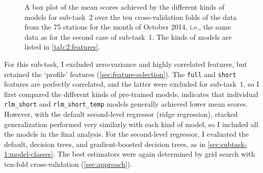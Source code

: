 \documentclass[11pt]{extarticle}
\newcommand{\rlmfull}{\texttt{rlm\_full}}
\newcommand{\rlmfulltemp}{\texttt{rlm\_full\_temp}}
\newcommand{\rlmshort}{\texttt{rlm\_short}}
\newcommand{\rlmshortfull}{\texttt{rlm\_short\_full}}
\newcommand{\rlmshortfulltemp}{\texttt{rlm\_short\_full\_temp}}
\newcommand{\rlmshorttemp}{\texttt{rlm\_short\_temp}}
\begin{document}
\begin{figure}
  \centering
  \caption{A box plot of the mean scores achieved by the different kinds of models for
    sub-task~2 over the ten cross-validation folds of the data from the 75 stations for
    the month of October 2014, i.e., the same data as for the second case of sub-task~1.
    The kinds of models are listed in \cref{tab:2:features}.
  }
  \label{fig:2:box-plot}
\end{figure}

For this sub-task, I excluded zero-variance and highly correlated features, but
retained the `profile' features (\cref{sec:feature-selection}).
The \texttt{full} and \texttt{short} features are perfectly correlated, and the latter
were excluded for sub-task~1, so I first compared the different kinds of pre-trained
models.
 indicates that individual \rlmshort{} and \rlmshorttemp{} models
generally achieved lower mean scores.
However, with the default second-level regressor (ridge regression), stacked
generalization performed very similarly with each kind of model, so I included all the
models in the final analysis.
For the second-level regressor, I evaluated the default, decision trees, and
gradient-boosted decision trees, as in \cref{sec:subtask-1:model-classes}.
The best estimators were again determined by grid search with ten-fold cross-validation
(\cref{sec:approach}).
\end{document}
